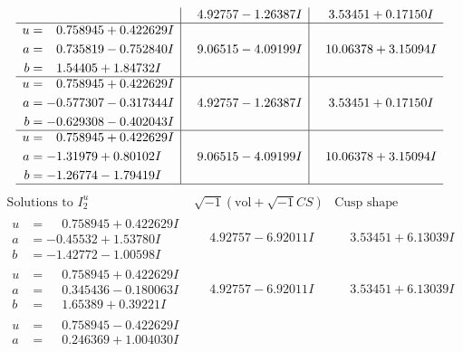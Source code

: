 \documentclass[1p]{elsarticle_modified}
\theoremstyle{definition}
\newcommand{\I}{\sqrt{-1}}
\begin{document}
$$\begin{array}{c|c|c}
 & \phantom{-}4.92757 - 1.26387 I & \phantom{-}3.53451 + 0.17150 I \\ \hline\begin{aligned}
u &= \phantom{-}0.758945 + 0.422629 I \\
a &= \phantom{-}0.735819 - 0.752840 I \\
b &= \phantom{-}1.54405 + 1.84732 I\end{aligned}
 & \phantom{-}9.06515 - 4.09199 I & \phantom{-}10.06378 + 3.15094 I \\ \hline\begin{aligned}
u &= \phantom{-}0.758945 + 0.422629 I \\
a &= -0.577307 - 0.317344 I \\
b &= -0.629308 - 0.402043 I\end{aligned}
 & \phantom{-}4.92757 - 1.26387 I & \phantom{-}3.53451 + 0.17150 I \\ \hline\begin{aligned}
u &= \phantom{-}0.758945 + 0.422629 I \\
a &= -1.31979 + 0.80102 I \\
b &= -1.26774 - 1.79419 I\end{aligned}
 & \phantom{-}9.06515 - 4.09199 I & \phantom{-}10.06378 + 3.15094 I\\
 \hline 
 \end{array}$$\newpage$$\begin{array}{c|c|c}  
\text{Solutions to }I^u_{2}& \I (\text{vol} + \sqrt{-1}CS) & \text{Cusp shape}\\
 \hline 
\begin{aligned}
u &= \phantom{-}0.758945 + 0.422629 I \\
a &= -0.45532 + 1.53780 I \\
b &= -1.42772 - 1.00598 I\end{aligned}
 & \phantom{-}4.92757 - 6.92011 I & \phantom{-}3.53451 + 6.13039 I \\ \hline\begin{aligned}
u &= \phantom{-}0.758945 + 0.422629 I \\
a &= \phantom{-}0.345436 - 0.180063 I \\
b &= \phantom{-}1.65389 + 0.39221 I\end{aligned}
 & \phantom{-}4.92757 - 6.92011 I & \phantom{-}3.53451 + 6.13039 I \\ \hline\begin{aligned}
u &= \phantom{-}0.758945 - 0.422629 I \\
a &= \phantom{-}0.246369 + 1.004030 I \\

\end{aligned}
\end{array}$$
\end{document}
